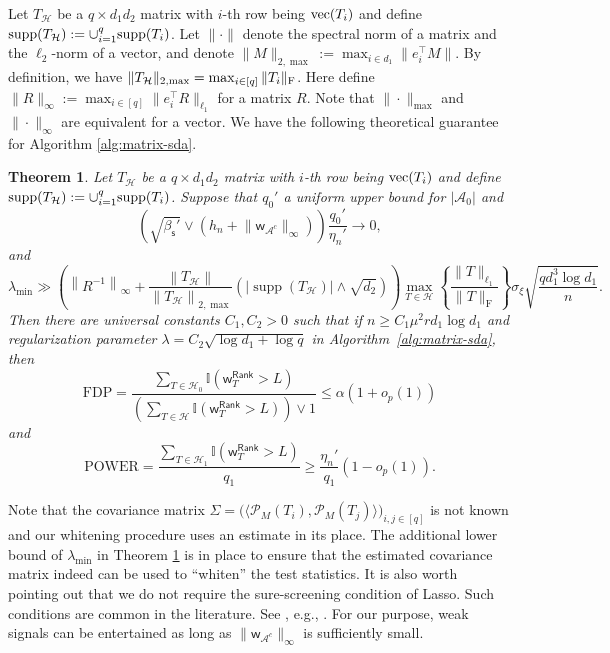 \documentclass[12pt]{article}
\newcommand{\abs}[1]{\left\lvert#1\right\rvert}
\newcommand{\norm}[1]{\left\lVert#1\right\rVert}
\newcommand{\cH}{\mathcal{H}}
\newcommand{\bbI}{\mathbb{I}}
\def\sfw{\mathsf{w}}
\def\calA{{\mathcal A}}
\def\calH{{\mathcal H}}
\def\calP{{\mathcal P}}
\newtheorem{Theorem}{Theorem}
\theoremstyle{plain}
\begin{document}
\begin{sloppypar}
Let $T_{\calH}$ be a $q\times d_1d_2$ matrix with $i$-th row being ${\rm vec}(T_i)$ and define ${\rm supp}(T_{\calH}):=\cup_{i=1}^q {\rm supp}(T_i)$. Let $\|\cdot\|$ denote the spectral norm of a matrix and the $\ell_2$-norm of a vector, and  denote $\|M\|_{2,\max}:=\max_{i\in d_1}\|e_i^{\top}M\|$. By definition, we have $\|T_{\calH}\|_{2,\max}=\max_{i\in[q]}\|T_i\|_{\rm F}$. Here define $\|R\|_{\infty}:=\max_{i\in[q]} \|e_i^{\top} R\|_{\ell_1}$ for a matrix $R$. Note that $\|\cdot\|_{\max}$ and $\|\cdot\|_{\infty}$ are equivalent for a vector. 
We have the following theoretical guarantee for Algorithm \ref{alg:matrix-sda}.
\begin{Theorem}\label{thm:matrix-fdr-strong}
 Let $T_{\calH}$ be a $q\times d_1d_2$ matrix with $i$-th row being ${\rm vec}(T_i)$ and define ${\rm supp}(T_{\calH}):=\cup_{i=1}^q {\rm supp}(T_i)$. Suppose that $q_{0}'$ a uniform upper bound for $\abs{\calA_0}$ and  
$$
\left(\sqrt{\beta_{\mathsf{s}}'} \vee  \left( h_n +\big\|\sfw_{\calA^c}\big\|_{\infty}\right)\right)  \frac{q_0'}{\eta_n'}   \to 0, 
$$
and
$$
\lambda_{\min}\gg 
    \left(\norm{ R^{-1}  }_\infty + \frac{  \norm{T_{\calH} }}{ \norm{T_{\calH} }_{2,\max} } \left( |\operatorname{supp}(T_{\calH} )|\wedge \sqrt{d_2} \right) \right) \max_{T\in\calH}\left\{ \frac{ \|T\|_{\ell_1} }{ \|T\|_{\mathrm{F}} } \right\} \sigma_\xi \sqrt{\frac{ q d_1^3 \log d_1 }{n}}.
$$
Then there are universal constants $C_1, C_2>0$ such that if $n\ge C_1 \mu^2 r d_1 \log d_1$ and regularization parameter $\lambda=C_2\sqrt{\log d_1 +\log q}$ in Algorithm~\ref{alg:matrix-sda}, then
$$
\mathrm{FDP}=\frac{\sum_{T\in \cH_0  } \bbI(\sfw_{T}^{\mathsf{Rank}} >L ) }{\left( \sum_{T\in \cH  } \bbI(\sfw_T^{\mathsf{Rank}} >L ) \right) \vee 1 } \le \alpha(1+o_p(1))
$$
and
$$
\mathrm{POWER}= \frac{\sum_{T\in \cH_1  } \bbI(\sfw_T^{\mathsf{Rank}} >L ) }{q_1} \ge \frac{\eta_n' }{q_1}(1-o_p(1)).
$$   
\end{Theorem}

Note that the covariance matrix $\Sigma=\big(\langle \calP_{M}(T_i), \calP_M(T_j)\rangle\big)_{i,j\in[q]}$ is not known and our whitening procedure uses an estimate in its place. The additional lower bound of $\lambda_{\min}$ in Theorem \ref{thm:matrix-fdr-strong} is in place to ensure that the estimated covariance matrix indeed can be used to ``whiten'' the test statistics. It is also worth pointing out that we do not require the sure-screening condition of Lasso. Such conditions are common in the literature. See , e.g., \cite{roeder2009genome,barber2019knockoff,du2021false,dai2023scale}. For our purpose, weak signals can be entertained as long as $\|\sfw_{\calA^c}\|_{\infty}$ is sufficiently small.


\end{sloppypar}
\end{document}
